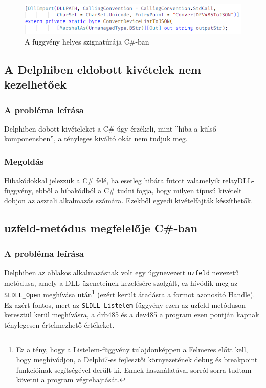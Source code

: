 \documentclass[tocnopagenum]{thesis-ekf}
\begin{document}
	\begin{figure}[H]
		\centering
		\includegraphics[scale=0.8]{string_csharp}
		\caption{A függvény helyes szignatúrája C\#-ban}
		\label{string_csharp}
	\end{figure}

	\subsection{A Delphiben eldobott kivételek nem kezelhetőek}
	\subsubsection{A probléma leírása} Delphiben dobott kivételeket a C\# úgy érzékeli, mint ''hiba a külső komponensben'', a tényleges kiváltó okát nem tudjuk meg.
	\subsubsection{Megoldás} Hibakódokkal jelezzük a C\# felé, ha esetleg hibára futott valamelyik relayDLL-függvény, ebből a hibakódból a C\# tudni fogja, hogy milyen típusú kivételt dobjon az asztali alkalmazás számára. Ezekből egyedi kivételfajták készíthetők.
	\subsection{uzfeld-metódus megfelelője C\#-ban}
	\subsubsection{A probléma leírása} Delphiben az ablakos alkalmazásnak volt egy úgynevezett \verb*|uzfeld| nevezetű metódusa, amely a DLL üzeneteinek kezelésére szolgált, ez hívódik meg az \verb*|SLDLL_Open| meghívása után\footnote{Ez a tény, hogy a Listelem-függvény tulajdonképpen a Felmeres előtt kell, hogy meghívódjon, a Delphi7-es fejlesztői környezetének debug és breakpoint funkcióinak segítségével derült ki. Ennek használatával sorról sorra tudtam követni a program végrehajtását.} (ezért került átadásra a formot azonosító Handle). Ez azért fontos, mert az \verb*|SLDLL_Listelem|-függvény ezen az uzfeld-metóduson keresztül kerül meghívásra, a drb485 és a dev485 a program ezen pontján kapnak ténylegesen értelmezhető értékeket.
\end{document}
